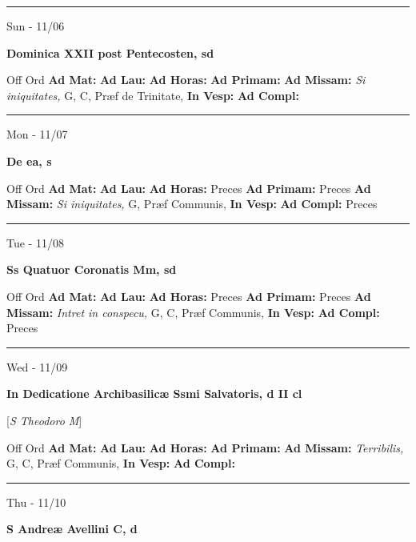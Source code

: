 \documentclass[letterpaper, 10pt]{article}
\begin{document}
\hrule
\begin{center}
Sun - 11/06
\end{center}\textbf{ \large Dominica XXII post Pentecosten, \textnormal{\normalsize sd}}
\begin{justify}
Off Ord
\textbf{Ad Mat: }
\textbf{Ad Lau: }
\textbf{Ad Horas: }
\textbf{Ad Primam: }
\textbf{Ad Missam:} \textit{Si iniquitates, } G, C, Præf de Trinitate, 
\textbf{In Vesp: }
\textbf{Ad Compl: }\end{justify}



\hrule
\begin{center}
Mon - 11/07
\end{center}\textbf{ \large De ea, \textnormal{\normalsize s}}
\begin{justify}
Off Ord
\textbf{Ad Mat: }
\textbf{Ad Lau: }
\textbf{Ad Horas: }Preces
\textbf{Ad Primam: }Preces
\textbf{Ad Missam:} \textit{Si iniquitates, } G, Præf Communis, 
\textbf{In Vesp: }
\textbf{Ad Compl: }Preces\end{justify}



\hrule
\begin{center}
Tue - 11/08
\end{center}\textbf{ \large Ss Quatuor Coronatis Mm, \textnormal{\normalsize sd}}
\begin{justify}
Off Ord
\textbf{Ad Mat: }
\textbf{Ad Lau: }
\textbf{Ad Horas: }Preces
\textbf{Ad Primam: }Preces
\textbf{Ad Missam:} \textit{Intret in conspecu, } G, C, Præf Communis, 
\textbf{In Vesp: }
\textbf{Ad Compl: }Preces\end{justify}



\hrule
\begin{center}
Wed - 11/09
\end{center}\textbf{ \large In Dedicatione Archibasilicæ Ssmi Salvatoris, \textnormal{\normalsize d II cl}}

[\textit{S Theodoro M}]
\begin{justify}
Off Ord
\textbf{Ad Mat: }
\textbf{Ad Lau: }
\textbf{Ad Horas: }
\textbf{Ad Primam: }
\textbf{Ad Missam:} \textit{Terribilis, } G, C, Præf Communis, 
\textbf{In Vesp: }
\textbf{Ad Compl: }\end{justify}



\hrule
\begin{center}
Thu - 11/10
\end{center}\textbf{ \large S Andreæ Avellini C, \textnormal{\normalsize d}}
\end{document}
